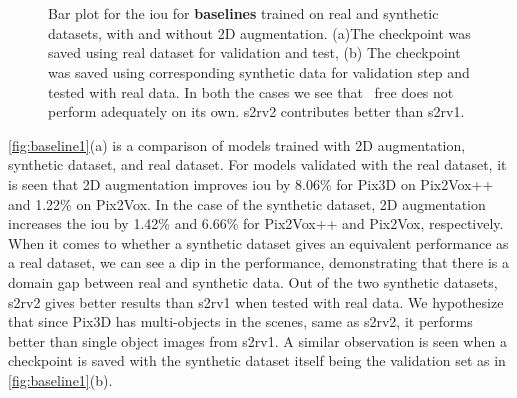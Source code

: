 

\begin{figure}[!ht]
    \centering
    \subfloat[][]{\resizebox{0.75\linewidth}{!}{}}\\
    \subfloat[][]{\resizebox{0.75\linewidth}{!}{}}\\
    \caption{Bar plot for the \gls{iou}  for \textbf{baselines} trained on real and synthetic datasets, with and without 2D augmentation.
        (a)The checkpoint was saved using real dataset for validation and test, (b) The checkpoint was saved using corresponding synthetic data for validation step and tested with real data.
        In both the cases we see that ~\gls{free} does not perform adequately on its own. \gls{s2rv2} contributes better than \gls{s2rv1}.}
    \label{fig:baseline1}
\end{figure}

\autoref{fig:baseline1}(a) is a comparison of models trained with 2D augmentation, synthetic dataset, and real dataset.
For models validated with the real dataset, it is seen that 2D augmentation improves \gls{iou}  by 8.06\% for Pix3D on Pix2Vox++ and 1.22\% on Pix2Vox.
In the case of the synthetic dataset, 2D augmentation increases the \gls{iou}  by 1.42\% and 6.66\% for Pix2Vox++ and Pix2Vox, respectively.
When it comes to whether a synthetic dataset gives an equivalent performance as a real dataset, we can see a dip in the performance, demonstrating that there is a domain gap between real and synthetic data.
Out of the two synthetic datasets, \gls{s2rv2} gives better results than \gls{s2rv1} when tested with real data.
We hypothesize that since Pix3D has multi-objects in the scenes, same as \gls{s2rv2}, it performs better than single object images from \gls{s2rv1}.
A similar observation is seen when a checkpoint is saved with the synthetic dataset itself being the validation set as in \autoref{fig:baseline1}(b).


